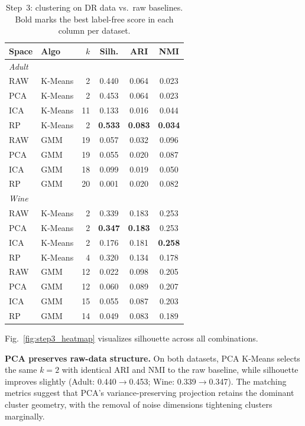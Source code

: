 \documentclass[conference]{IEEEtran}
\begin{document}
\begin{table}[t]
\centering
\caption{Step~3: clustering on DR data vs.\ raw baselines. Bold marks
the best label-free score in each column per dataset.}
\label{tab:step3}
\begin{tabular}{llrccc}
\toprule
\textbf{Space} & \textbf{Algo} & $k$ & \textbf{Silh.} & \textbf{ARI} & \textbf{NMI} \\
\midrule
\multicolumn{6}{l}{\emph{Adult}} \\
RAW & K-Means &  2 & 0.440 & 0.064 & 0.023 \\
PCA & K-Means &  2 & 0.453 & 0.064 & 0.023 \\
ICA & K-Means & 11 & 0.133 & 0.016 & 0.044 \\
RP  & K-Means &  2 & \textbf{0.533} & \textbf{0.083} & \textbf{0.034} \\
RAW & GMM     & 19 & 0.057 & 0.032 & 0.096 \\
PCA & GMM     & 19 & 0.055 & 0.020 & 0.087 \\
ICA & GMM     & 18 & 0.099 & 0.019 & 0.050 \\
RP  & GMM     & 20 & 0.001 & 0.020 & 0.082 \\
\midrule
\multicolumn{6}{l}{\emph{Wine}} \\
RAW & K-Means &  2 & 0.339 & 0.183 & 0.253 \\
PCA & K-Means &  2 & \textbf{0.347} & \textbf{0.183} & 0.253 \\
ICA & K-Means &  2 & 0.176 & 0.181 & \textbf{0.258} \\
RP  & K-Means &  4 & 0.320 & 0.134 & 0.178 \\
RAW & GMM     & 12 & 0.022 & 0.098 & 0.205 \\
PCA & GMM     & 12 & 0.060 & 0.089 & 0.207 \\
ICA & GMM     & 15 & 0.055 & 0.087 & 0.203 \\
RP  & GMM     & 14 & 0.049 & 0.083 & 0.189 \\
\bottomrule
\end{tabular}
\end{table}

Fig.~\ref{fig:step3_heatmap} visualizes silhouette across all
combinations.

\textbf{PCA preserves raw-data structure.} On both datasets, PCA
K-Means selects the same $k{=}2$ with identical ARI and NMI to the
raw baseline, while silhouette improves slightly (Adult: 0.440$\to$0.453;
Wine: 0.339$\to$0.347). The matching metrics suggest that PCA's
variance-preserving projection retains the dominant cluster geometry,
with the removal of noise dimensions tightening clusters marginally.
\end{document}
